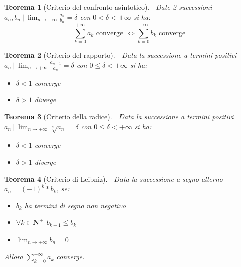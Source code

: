 \documentclass{article}
\newtheorem{theorem}{Teorema}
\begin{document}
\vspace{8pt}

\begin{theorem}[Criterio del confronto asintotico]$\ $\newline
    Date 2 successioni $a_n,b_n\ |\ \lim_{n\rightarrow+\infty}\frac{a_n}{b_n}=\delta$ con $0<\delta<+\infty$ si ha:
    $$\sum_{k=0}^{+\infty}a_k \text{ converge }\iff\sum_{k=0}^{+\infty}b_k\text{ converge }$$
\end{theorem}

\vspace{8pt}

\begin{theorem}[Criterio del rapporto]$\ $\newline
    Data la successione a termini positivi $a_n\ |\ \lim_{n\rightarrow+\infty}\frac{a_{n+1}}{a_n}=\delta$ con $0\leq\delta<+\infty$ si ha:
    \begin{itemize}
        \item $\delta<1$ converge
        \item $\delta>1$ diverge
    \end{itemize}
\end{theorem}

\vspace{8pt}

\begin{theorem}[Criterio della radice]$\ $\newline
    Data la successione a termini positivi $a_n\ |\ \lim_{n\rightarrow+\infty}\sqrt[n]{a_n}=\delta$ con $0\leq\delta<+\infty$ si ha:
    \begin{itemize}
        \item $\delta<1$ converge
        \item $\delta>1$ diverge
    \end{itemize}
\end{theorem}

\vspace{8pt}

\begin{theorem}[Criterio di Leibniz]$\ $\newline
    Data la successione a segno alterno $a_n=(-1)^k*b_k$, se:
    \begin{itemize}
        \item $b_k$ ha termini di segno non negativo
        \item $\forall k\in\mathbf{N^+}\ \ b_{k+1}\leq b_k$
        \item $\lim_{n\rightarrow+\infty}b_n=0$
    \end{itemize}

    \noindent Allora $\sum_{k=0}^{+\infty}a_k$ converge.
    
\end{theorem}
\end{document}
